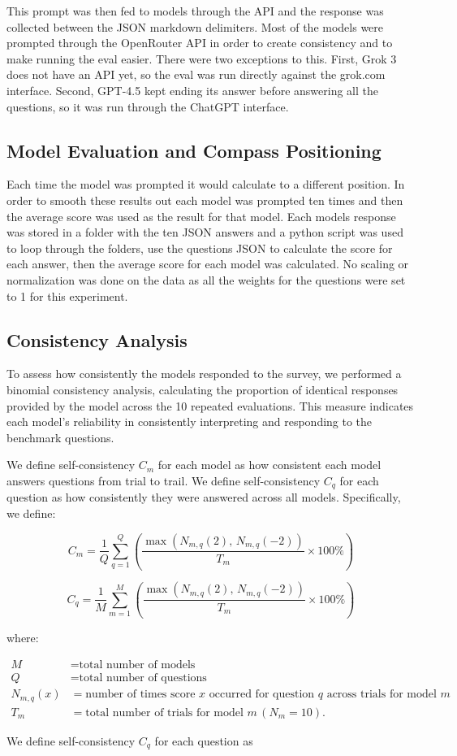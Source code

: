 This prompt was then fed to models through the API and the response was collected between the JSON markdown delimiters. Most of the models were prompted through the OpenRouter API in order to create consistency and to make running the eval easier. There were two exceptions to this. First, Grok 3 does not have an API yet, so the eval was run directly against the grok.com interface. Second, GPT-4.5 kept ending its answer before answering all the questions, so it was run through the ChatGPT interface.

\subsection{Model Evaluation and Compass Positioning}
Each time the model was prompted it would calculate to a different position. In order to smooth these results out each model was prompted ten times and then the average score was used as the result for that model. Each models response was stored in a folder with the ten JSON answers and a python script was used to loop through the folders, use the questions JSON to calculate the score for each answer, then the average score for each model was calculated. No scaling or normalization was done on the data as all the weights for the questions were set to 1 for this experiment.

\subsection{Consistency Analysis}
To assess how consistently the models responded to the survey, we performed a binomial consistency analysis, calculating the proportion of identical responses provided by the model across the 10 repeated evaluations. This measure indicates each model's reliability in consistently interpreting and responding to the benchmark questions.

We define self-consistency \(C_m\) for each model as how consistent each model answers questions from trial to trail. We define self-consistency \(C_q\) for each question as how consistently they were answered across all models. Specifically, we define:

\[
C_m = \frac{1}{Q}
  \sum_{q=1}^{Q}
  \left(\frac{
    \max\left(N_{m,q}(2),\, N_{m,q}(-2)\right)
  }{
    T_m
  }
  \times 100\% \right)
\]

\[
C_q =  \frac{1}{M} 
\sum_{m=1}^{M}
\left( \frac{
  \max\left(N_{m,q}(2),\, N_{m,q}(-2)\right)
  }{
    T_m
  }
\times 100\% \right)
\]

\noindent where:

\[
\begin{aligned}
M &= \text{total number of models} \\
Q &= \text{total number of questions} \\
N_{m,q}(x) &= \text{number of times score } x \text{ occurred for question } q \text{ across trials for model } m \\
T_m &= \text{total number of trials for model } m \, (N_m = 10).
\end{aligned}
\]

We define self-consistency \(C_q\) for each question as